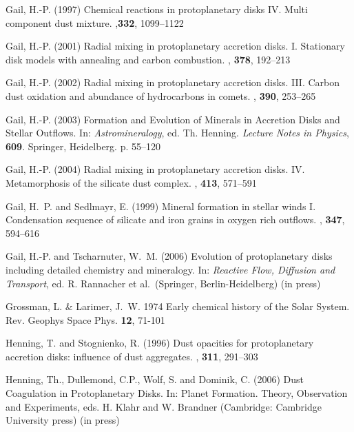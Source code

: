 \begin{ownpubl}
\item
Gail, H.-P. (1997) Chemical reactions in protoplanetary disks IV. Multi
component dust mixture. \aap,\textbf{332}, 1099--1122

\item
Gail, H.-P. (2001) Radial mixing in protoplanetary accretion disks. I.
Stationary disk models with annealing and carbon combustion. \aap, \textbf{378},
192--213

\item
Gail, H.-P. (2002)
Radial mixing in protoplanetary accretion disks. III. Carbon dust oxidation and
abundance of hydrocarbons in comets. \aap, \textbf{390}, 253--265

\item
Gail, H.-P. (2003) Formation and Evolution of Minerals in Accretion Disks and
Stellar Outflows. In: \textit{Astromineralogy}, ed. Th. Henning. \textit{Lecture
Notes in Physics}, \textbf{609}. Springer, Heidelberg. p. 55--120

\item
Gail, H.-P. (2004) Radial mixing in protoplanetary accretion disks. IV.
Metamorphosis of the silicate dust complex. \aap, \textbf{413}, 571--591

\item
Gail, H.~P. and Sedlmayr, E. (1999) Mineral formation in stellar winds I.
Condensation sequence of silicate and iron grains in oxygen rich outflows.
\aap, \textbf{347}, 594--616

\item
Gail, H.-P. and Tscharnuter, W.~M. (2006) Evolution of protoplanetary disks
including detailed chemistry and mineralogy. In: \textit{Reactive Flow,
Diffusion and Transport}, ed. R. Rannacher et al.~(Springer, Berlin-Heidelberg)
(in press)

\item Grossman, L. \& Larimer, J.~W. 1974 Early chemical history of the
Solar System. Rev. Geophys Space Phys. \textbf{12}, 71-101


\item
Henning, T. and Stognienko, R. (1996) Dust opacities for protoplanetary accretion
disks: influence of dust aggregates. \aap, \textbf{311}, 291--303

\item
Henning, Th., Dullemond, C.P., Wolf, S. and Dominik, C. (2006) Dust Coagulation
in Protoplanetary Disks. In:  Planet Formation. Theory, Observation and
Experiments, eds. H. Klahr and W. Brandner (Cambridge: Cambridge University
press) (in press)


\end{ownpubl}
